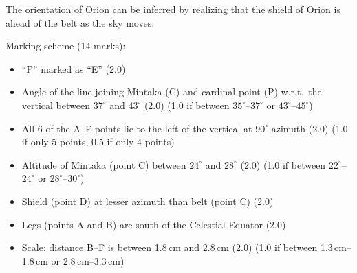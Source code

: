 The orientation of Orion can be inferred by realizing that the shield of
Orion is ahead of the belt as the sky moves.


Marking scheme (14 marks):
\begin{itemize}
\item ``P'' marked as ``E'' \hfill(2.0)
\item Angle of the line joining Mintaka (C) and cardinal point (P) w.r.t.\
  the vertical between $37^\circ$ and $43^\circ$ \hfill(2.0)
  (1.0 if between $35^\circ$--$37^\circ$ or $43^\circ$--$45^\circ$)
\item All 6 of the A--F points lie to the left of the vertical at $90^\circ$
  azimuth \hfill(2.0)
  (1.0 if only 5 points, 0.5 if only 4 points)
\item Altitude of Mintaka (point C) between $24^\circ$ and $28^\circ$
  \hfill(2.0)
  (1.0 if between $22^\circ$--$24^\circ$ or $28^\circ$--$30^\circ$)
\item Shield (point D) at lesser azimuth than belt (point C) \hfill(2.0)
\item Legs (points A and B) are south of the Celestial Equator \hfill(2.0)
\item Scale: distance B--F is between 1.8\,cm and 2.8\,cm \hfill(2.0)
  (1.0 if between 1.3\,cm--1.8\,cm or 2.8\,cm--3.3\,cm)
\end{itemize}
